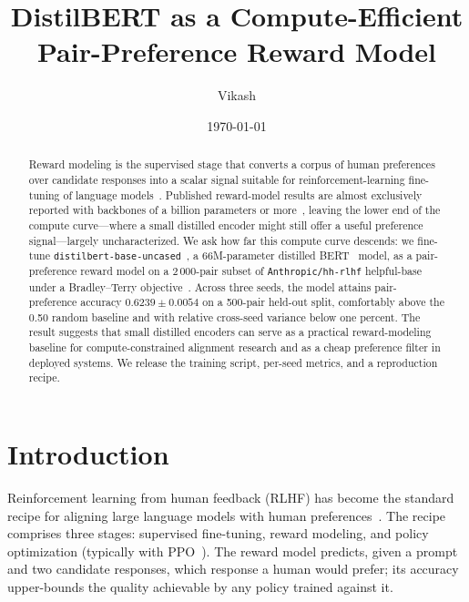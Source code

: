 \documentclass[11pt]{article}
\title{DistilBERT as a Compute-Efficient Pair-Preference Reward Model}
\author[1]{Vikash}
\affil[1]{Independent}
\date{\today}
\begin{document}
\maketitle

\begin{abstract}
Reward modeling is the supervised stage that converts a corpus of human preferences over candidate responses into a scalar signal suitable for reinforcement-learning fine-tuning of language models~\cite{christiano2017preferences,ouyang2022instructgpt}. Published reward-model results are almost exclusively reported with backbones of a billion parameters or more~\cite{bai2022hhrlhf,ouyang2022instructgpt,stiennon2020summarization}, leaving the lower end of the compute curve---where a small distilled encoder might still offer a useful preference signal---largely uncharacterized. We ask how far this compute curve descends: we fine-tune \texttt{distilbert-base-uncased}~\cite{sanh2019distilbert}, a 66M-parameter distilled BERT~\cite{devlin2019bert} model, as a pair-preference reward model on a 2\,000-pair subset of \texttt{Anthropic/hh-rlhf} helpful-base~\cite{bai2022hhrlhf} under a Bradley--Terry objective~\cite{bradley1952rank}. Across three seeds, the model attains pair-preference accuracy $0.6239 \pm 0.0054$ on a 500-pair held-out split, comfortably above the 0.50 random baseline and with relative cross-seed variance below one percent. The result suggests that small distilled encoders can serve as a practical reward-modeling baseline for compute-constrained alignment research and as a cheap preference filter in deployed systems. We release the training script, per-seed metrics, and a reproduction recipe.
\end{abstract}

\section{Introduction}
\label{sec:intro}

Reinforcement learning from human feedback (RLHF) has become the standard recipe for aligning large language models with human preferences~\cite{christiano2017preferences,ouyang2022instructgpt,bai2022hhrlhf}. The recipe comprises three stages: supervised fine-tuning, reward modeling, and policy optimization (typically with PPO~\cite{schulman2017ppo}). The reward model predicts, given a prompt and two candidate responses, which response a human would prefer; its accuracy upper-bounds the quality achievable by any policy trained against it.
\end{document}
